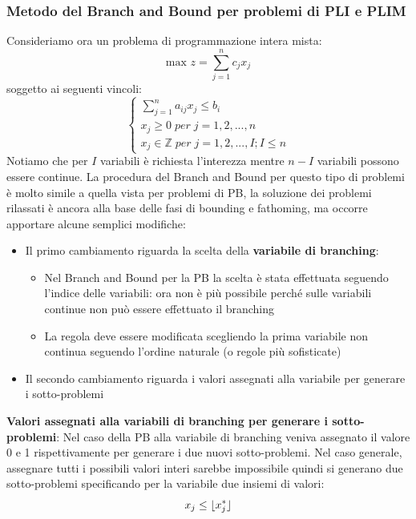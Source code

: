 \documentclass[12pt]{article}
\DeclarePairedDelimiter\floor{\lfloor}{\rfloor}
\begin{document}
\subsubsection{Metodo del Branch and Bound per problemi di PLI e PLIM}
Consideriamo ora un problema di programmazione intera mista:
$$\textrm{max } z = \sum_{j=1}^{n}c_j x_j$$
soggetto ai seguenti vincoli:
$$\begin{cases}
    \sum_{j=1}^{n}a_{ij}x_j \leq b_i \\
    x_j \geq 0 \; per \; j=1,2,...,n \\
    x_j \in \mathbb{Z} \; per \; j = 1,2,...,I; I \leq n
\end{cases}$$
Notiamo che per $I$ variabili è richiesta l'interezza mentre $n-I$ variabili possono essere continue.
La procedura del Branch and Bound per questo tipo di problemi è molto simile a quella vista per problemi di PB, la
soluzione dei problemi rilassati è ancora alla base delle fasi di bounding e fathoming, ma occorre apportare alcune semplici modifiche:
\begin{itemize}
    \item Il primo cambiamento riguarda la scelta della \textbf{variabile di branching}:
    \begin{itemize}
        \item Nel Branch and Bound per la PB la scelta è stata effettuata seguendo l'indice delle variabili: ora non è 
        più possibile perché sulle variabili continue non può essere effettuato il branching
        \item La regola deve essere modificata scegliendo la prima variabile non continua seguendo l'ordine naturale (o regole più sofisticate)
    \end{itemize}
    \item Il secondo cambiamento riguarda i valori assegnati alla variabile per generare i sotto-problemi
\end{itemize}
\textbf{Valori assegnati alla variabili di branching per generare i sotto-problemi}: \newline
Nel caso della PB alla variabile di branching veniva assegnato il valore 0 e 1 rispettivamente per generare
i due nuovi sotto-problemi. Nel caso generale, assegnare tutti i possibili valori interi sarebbe impossibile 
quindi si generano due sotto-problemi specificando per la variabile due insiemi di valori:
$$x_j \leq \floor{x_j^*}$$
\end{document}

